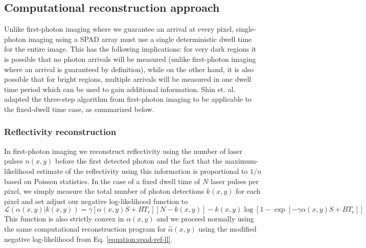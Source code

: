 \subsection{Computational reconstruction approach}

Unlike first-photon imaging where we guarantee an arrival at every pixel, single-photon imaging using a SPAD array must use a single deterministic dwell time for the entire image. This has the following implications: for very dark regions it is possible that no photon arrivals will be measured (unlike first-photon imaging where an arrival is guaranteed by definition), while on the other hand, it is also possible that for bright regions, multiple arrivals will be measured in one dwell time period which can be used to gain additional information. Shin et. al. \cite{kirmani-photon} adapted the three-step algorithm from first-photon imaging to be applicable to the fixed-dwell time case, as summarized below.

\subsubsection{Reflectivity reconstruction}
In first-photon imaging we reconstruct reflectivity using the number of laser pulses $n(x,y)$ before the first detected photon and the fact that the maximum-likelihood estimate of the reflectivity using this information is proportional to $1/n$ based on Poisson statistics. In the case of a fixed dwell time of $N$ laser pulses per pixel, we simply measure the total number of photon detections $k(x,y)$ for each pixel and set adjust our negative log-likelihood function to
\begin{equation}
\mathcal{L}\left( \alpha(x,y) | k(x,y) \right) = \gamma \left[ \alpha(x,y) S + B T_r \right] \left[ N - k(x,y) \right] - k(x,y) \log \left[ 1 - \exp \left[ - \gamma \alpha(x,y) S + B T_r \right] \right]
\label{equation:spad-ref-ll}
\end{equation}
This function is also strictly convex in $\alpha(x,y)$ and we proceed normally using the same computational reconstruction program for $\hat{\alpha}(x,y)$ using the modified negative log-likelihood from Eq. \ref{equation:spad-ref-ll}.

